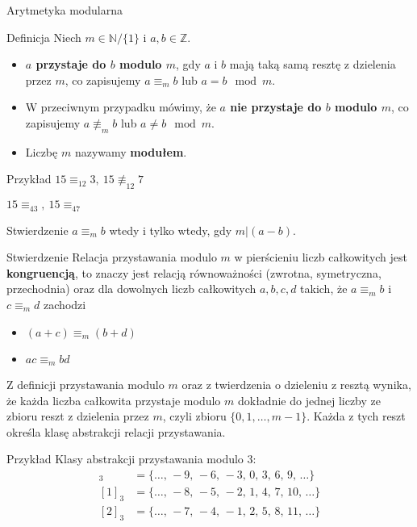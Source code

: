 \documentclass[a4paper,10pt]{beamer}
\begin{document}
\begin{frame}{Arytmetyka modularna}
	
	\begin{block}{Definicja}
		Niech $m\in\mathbb{N}/\{1\}$ i $a,b\in\mathbb{Z}$.
		\begin{itemize}
			\item {\bf $a$ przystaje do $b$ modulo $m$}, gdy $a$ i $b$ mają taką samą resztę z dzielenia przez $m$, co zapisujemy $a\equiv_mb$ lub $a=b\mod m$.
			\item W przeciwnym przypadku mówimy, że {\bf $a$ nie przystaje do $b$ modulo $m$}, co zapisujemy $a\not\equiv_mb$ lub $a\neq b\mod m$.
			\item Liczbę $m$ nazywamy {\bf modułem}.
		\end{itemize}
	\end{block}
	
	\begin{exampleblock}{Przykład}				
		$15\equiv_{12}3,\ 15\not\equiv_{12}7$
		
		$15\equiv_43,\ 15\equiv_47$
	\end{exampleblock}

	\begin{block}{Stwierdzenie}
		$a\equiv_m b$ wtedy i tylko wtedy, gdy $m|(a-b)$.
	\end{block}
	
\end{frame}


\begin{frame}
	
	\begin{block}{Stwierdzenie}
		Relacja przystawania modulo $m$ w pierścieniu liczb całkowitych jest {\bf kongruencją}, to znaczy jest relacją równoważności (zwrotna, symetryczna, przechodnia) oraz dla dowolnych liczb całkowitych $a,b,c,d$ takich, że $a\equiv_mb$ i $c\equiv_md$ zachodzi
		\begin{itemize}
			\item $(a+c)\equiv_m(b+d)$
			\item $ac\equiv_mbd$
		\end{itemize}
	\end{block}

	Z definicji przystawania modulo $m$ oraz z twierdzenia o dzieleniu z resztą wynika, że każda liczba całkowita przystaje modulo $m$ dokładnie do jednej liczby ze zbioru reszt z dzielenia przez $m$, czyli zbioru $\{0,1,\ldots,m-1\}$. Każda z tych reszt określa klasę abstrakcji relacji przystawania.
	
	\begin{exampleblock}{Przykład}
		Klasy abstrakcji przystawania modulo $3$:
		\begin{align*}
			[0]_3&=\{\ldots,\,-9,\,-6,\,-3,\,0,\,3,\,6,\,9,\,\ldots\}\\
			[1]_3&=\{\ldots,\,-8,\,-5,\,-2,\,1,\,4,\,7,\,10,\,\ldots\}\\
			[2]_3&=\{\ldots,\,-7,\,-4,\,-1,\,2,\,5,\,8,\,11,\,\ldots\}
		\end{align*}		
	\end{exampleblock}
	
\end{frame}
\end{document}
